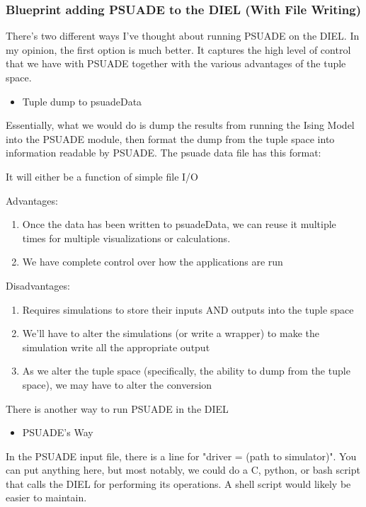 \documentclass[11pt]{article} %
\begin{document}
\subsubsection{Blueprint adding PSUADE to the DIEL (With File Writing)}

There's two different ways I've thought about running PSUADE on the DIEL. In my opinion, the first option is much better. It captures the high level of control that we have with PSUADE together with the various advantages of the tuple space.

\begin{itemize}
	\item Tuple dump to psuadeData
\end{itemize}

Essentially, what we would do is dump the results from running the Ising Model into the PSUADE module, then format the dump from the tuple space into information readable by PSUADE. The psuade data file has this format:


It will either be a function of simple file I/O 

Advantages:
\begin{enumerate}
	\item Once the data has been written to psuadeData, we can reuse it multiple times for multiple visualizations or calculations.
	\item We have complete control over how the applications are run
\end{enumerate}

Disadvantages:
\begin{enumerate}
	\item Requires simulations to store their inputs AND outputs into the tuple space
	\item We'll have to alter the simulations (or write a wrapper) to make the simulation write all the appropriate output
	\item As we alter the tuple space (specifically, the ability to dump from the tuple space), we may have to alter the conversion
\end{enumerate}

There is another way to run PSUADE in the DIEL

\begin{itemize}
	\item PSUADE's Way\\
\end{itemize}

In the PSUADE input file, there is a line for "driver = (path to simulator)". You can put anything here, but most notably, we could do a C, python, or bash script that calls the DIEL for performing its operations. A shell script would likely be easier to maintain.
\end{document}
